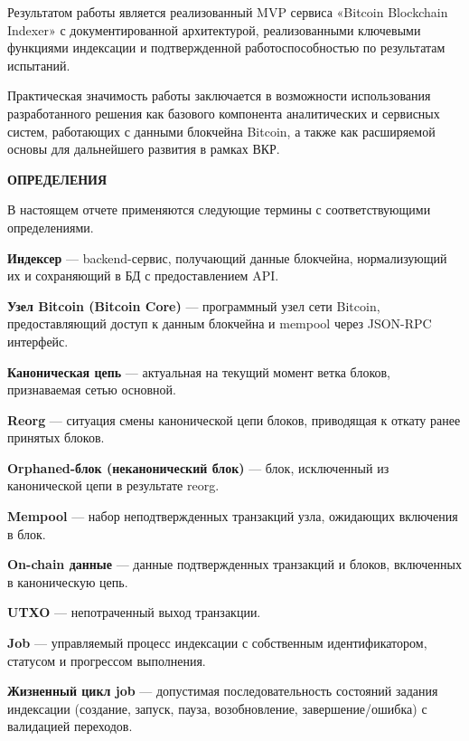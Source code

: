 ﻿\documentclass[14pt,a4paper]{extarticle}
\begin{document}
\noindent Результатом работы является реализованный MVP сервиса «Bitcoin Blockchain Indexer» с документированной архитектурой, реализованными ключевыми функциями индексации и подтвержденной работоспособностью по результатам испытаний.

\noindent Практическая значимость работы заключается в возможности использования разработанного решения как базового компонента аналитических и сервисных систем, работающих с данными блокчейна Bitcoin, а также как расширяемой основы для дальнейшего развития в рамках ВКР.

\newpage

\tableofcontents
\newpage

\begin{center}
\textbf{ОПРЕДЕЛЕНИЯ}
\end{center}

\noindent В настоящем отчете применяются следующие термины с соответствующими определениями.

\noindent \textbf{Индексер} — backend-сервис, получающий данные блокчейна, нормализующий их и сохраняющий в БД с предоставлением API.

\noindent \textbf{Узел Bitcoin (Bitcoin Core)} — программный узел сети Bitcoin, предоставляющий доступ к данным блокчейна и mempool через JSON-RPC интерфейс.

\noindent \textbf{Каноническая цепь} — актуальная на текущий момент ветка блоков, признаваемая сетью основной.

\noindent \textbf{Reorg} — ситуация смены канонической цепи блоков, приводящая к откату ранее принятых блоков.

\noindent \textbf{Orphaned-блок (неканонический блок)} — блок, исключенный из канонической цепи в результате reorg.

\noindent \textbf{Mempool} — набор неподтвержденных транзакций узла, ожидающих включения в блок.

\noindent \textbf{On-chain данные} — данные подтвержденных транзакций и блоков, включенных в каноническую цепь.

\noindent \textbf{UTXO} — непотраченный выход транзакции.

\noindent \textbf{Job} — управляемый процесс индексации с собственным идентификатором, статусом и прогрессом выполнения.

\noindent \textbf{Жизненный цикл job} — допустимая последовательность состояний задания индексации (создание, запуск, пауза, возобновление, завершение/ошибка) с валидацией переходов.
\end{document}
